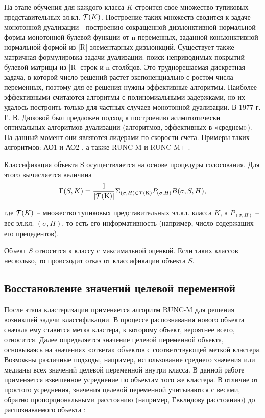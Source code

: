 \documentclass{article}
\begin{document}
На этапе обучения для каждого класса $K$ строится свое множество тупиковых представительных эл.кл. $\cal T(\text{$K$})$. Построение таких множеств сводится к задаче монотонной дуализации - построению сокращенной дизъюнктивной нормальной формы монотонной булевой функции от n переменных, заданной конъюнктивной нормальной формой из |R| элементарных дизъюнкций. Существует также матричная формулировка задачи дуализации: поиск неприводимых покрытий булевой матрицы из |R| строк и n столбцов. Это труднорешаемая дискретная задача, в которой число решений растет экспоненциально с ростом числа переменных, поэтому для ее решения нужны эффективные алгоритмы. Наиболее эффективными считаются алгоритмы с полиномиальными задержками, но их удалось построить только для частных случаев монотонной дуализации. В 1977 г. Е. В. Дюковой был предложен подход к построению асимптотически оптимальных алгоритмов дуализации (алгоритмов, эффективных в «среднем»). На данный момент они являются лидерами по скорости счета. Примеры таких алгоритмов: АО1 и АО2 \cite{author7}, а также RUNC-M \cite{author12} и RUNC-M+ \cite{author9}.

Классификация объекта S осуществляется на основе процедуры голосования. Для этого вычисляется величина 
    $$\Gamma(S,K) =  \frac{1}{|\cal T(\text{K})|}\Sigma_{(\sigma, H) \in \cal T(\text{K})} P_{(\sigma, H)} B(\sigma,S,H)\text{,}$$

где $\cal T(\text{$K$})$ -- множество тупиковых представительных эл.кл. класса $K$, а $P_{(\sigma, H)}$ -- вес эл.кл. $(\sigma, H)$, то есть его информативность (например, число содержащих его прецедентов).

Объект $S$ относится к классу с максимальной оценкой. Если таких классов несколько, то происходит отказ от классификации объекта $S$.


\subsection{Восстановление значений целевой переменной}
После этапа кластеризации применяется алгоритм RUNC-M для решения возникшей задачи классификации. В процессе распознавания нового объекта сначала ему ставится метка кластера, к которому объект, вероятнее всего, относится. Далее определяется значение целевой переменной объекта, основываясь на значениях «ответа» объектов с соответствующей меткой кластера. Возможны различные подходы, например, использование среднего значения или медианы всех значений целевой переменной внутри класса. В данной работе применяется взвешенное усреднение по объектам того же кластера. В отличие от простого усреднения, значения целевой переменной учитываются с весами, обратно пропорциональными расстоянию (например, Евклидову расстоянию) до распознаваемого объекта \cite{author1_year}:\\
\end{document}
